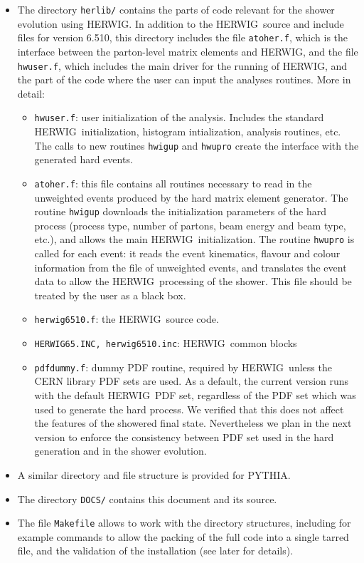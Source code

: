 \documentclass[paper]{JHEP3}
\def\herwig{{\small HERWIG}}
\def\pythia{{\small PYTHIA}}
\begin{document}
\begin{appendix}
\begin{itemize}
\item The directory {\tt herlib/} contains the parts of code relevant
  for the shower evolution using \herwig. In addition to the \herwig\ 
  source and include files for version 6.510, this directory includes
  the file {\tt atoher.f}, which is the interface between the
  parton-level matrix elements and \herwig, and the file {\tt
    hwuser.f}, which includes the main driver for the running of \herwig,
  and the part of the code where the user can input the analyses
  routines. More in detail:
  \begin{itemize}
  \item {\tt hwuser.f}: user initialization of the analysis. Includes
    the standard \herwig\ initialization, histogram intialization,
    analysis routines, etc.  The calls to new routines {\tt hwigup}
    and {\tt hwupro} create the interface with the generated hard
    events. 
  \item {\tt atoher.f}: this file contains all routines necessary to
    read in the unweighted events produced by the hard matrix element
    generator.  The routine {\tt hwigup} downloads the initialization
    parameters of the hard process (process type, number of partons,
    beam energy and beam type, etc.), and allows the main \herwig\
    initialization. The routine {\tt hwupro} is called for each event:
    it reads the event kinematics, flavour and colour information from
    the file of unweighted events, and translates the event data to
    allow the \herwig\ processing of the shower.  This file should be
    treated by the user as a black box.
  \item {\tt herwig6510.f}: the \herwig\ source code. 
  \item {\tt HERWIG65.INC, herwig6510.inc}: \herwig\  common blocks
  \item {\tt pdfdummy.f}: dummy PDF routine, required by \herwig\ 
    unless the CERN library PDF sets are used. As a default, the
    current version runs with the default \herwig\ PDF set, regardless
    of the PDF set which was used to generate the hard process. We
    verified that this does not affect the features of the showered
    final state.  Nevertheless we plan in the next version to enforce
    the consistency between PDF set used in the hard generation and in
    the shower evolution.
  \end{itemize} 
\item A similar directory and file structure is provided for \pythia.
\item The  directory {\tt DOCS/} contains this document and its
source. 
\item The file {\tt Makefile} allows to work with the directory
structures, including for example commands to allow the packing of the
full code into a single tarred file, and the validation of the installation
(see later for details).
\end{itemize} 


\end{appendix}
\end{document}
